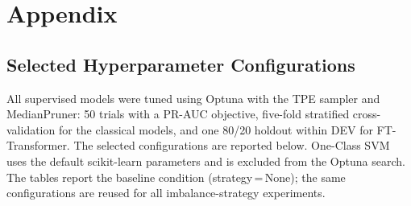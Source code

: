 ﻿\appendix
\chapter{Appendix}
\label{chapter:annex}

\raggedbottom

\section{Selected Hyperparameter Configurations}
\label{appendixA}

All supervised models were tuned using Optuna with the TPE sampler and MedianPruner: 50 trials with a PR-AUC objective, five-fold stratified cross-validation for the classical models, and one 80/20 holdout within DEV for FT-Transformer. The selected configurations are reported below. One-Class SVM uses the default scikit-learn parameters and is excluded from the Optuna search. The tables report the baseline condition (strategy\,=\,None); the same configurations are reused for all imbalance-strategy experiments.


